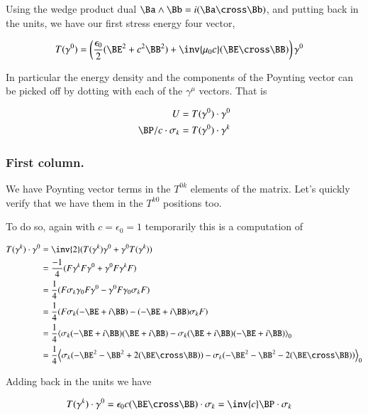 Using the wedge product dual $\Ba \wedge \Bb = i (\Ba \cross \Bb)$, and putting back in the units, we have our
first stress energy four vector, 

\begin{align}
T(\gamma^0) &= \left( \frac{\epsilon_0}{2} (\BE^2 + c^2 \BB^2) + \inv{\mu_0 c} (\BE \cross \BB) \right) \gamma^0 
\end{align}

In particular the energy density and the components of the Poynting vector can be picked off by dotting with each of the $\gamma^\mu$ vectors.  That is

\begin{align}
U                    &= T(\gamma^0) \cdot \gamma^0 \\
\BP/c \cdot \sigma_k &= T(\gamma^0) \cdot \gamma^k
\end{align}

\subsubsection{First column. }

We have Poynting vector terms in the $T^{0k}$ elements of the matrix.  Let's quickly verify that we have them
in the $T^{k0}$ positions too.

To do so, again with $c = \epsilon_0 = 1$ temporarily this is a computation of

\begin{align*}
T(\gamma^k) \cdot \gamma^0 
&= \inv{2} (T(\gamma^k) \gamma^0 + \gamma^0 T(\gamma^k)) \\
&= \frac{-1}{4} (F \gamma^k F \gamma^0 + \gamma^0 F \gamma^k F) \\
&= \frac{1}{4} (F \sigma_k \gamma_0 F \gamma^0 - \gamma^0 F \gamma_0 \sigma_k F) \\
&= \frac{1}{4} (F \sigma_k (-\BE + i \BB) - (-\BE + i\BB) \sigma_k F) \\
&= \frac{1}{4} \gpgradezero{\sigma_k (-\BE + i \BB)(\BE + i \BB) - \sigma_k (\BE + i \BB)(-\BE + i\BB) } \\
&= \frac{1}{4} \gpgradezero{\sigma_k (-\BE^2 -\BB^2 +2 (\BE \cross \BB)) - \sigma_k (-\BE^2 -\BB^2 - 2(\BE \cross \BB)) } \\
\end{align*}

Adding back in the units we have

\begin{align}
T(\gamma^k) \cdot \gamma^0 &= \epsilon_0 c (\BE \cross \BB) \cdot \sigma_k = \inv{c}\BP \cdot \sigma_k
\end{align}

